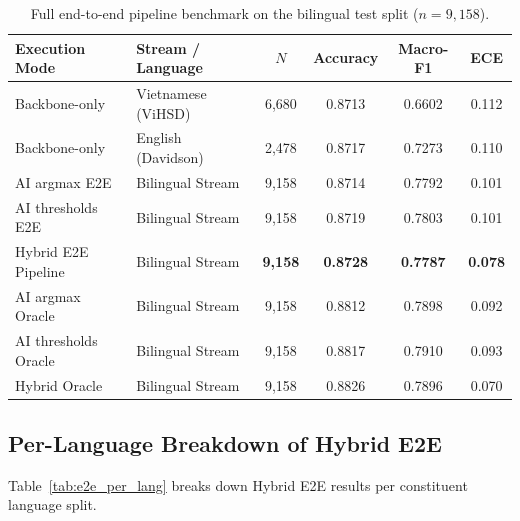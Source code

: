 \documentclass[runningheads]{llncs}
\begin{document}
\begin{table}[H]
\centering
\caption{Full end-to-end pipeline benchmark on the bilingual test split ($n=9{,}158$).}
\label{tab:e2e_detailed_full}
\begin{tabular}{llcccc}
\toprule
Execution Mode & Stream / Language & $N$ & Accuracy & Macro-F1 & ECE \\
\midrule
Backbone-only & Vietnamese (ViHSD) & 6,680 & 0.8713 & 0.6602 & 0.112 \\
Backbone-only & English (Davidson) & 2,478 & 0.8717 & 0.7273 & 0.110 \\
\midrule
AI argmax E2E & Bilingual Stream & 9,158 & 0.8714 & 0.7792 & 0.101 \\
AI thresholds E2E & Bilingual Stream & 9,158 & 0.8719 & 0.7803 & 0.101 \\
Hybrid E2E Pipeline & Bilingual Stream & \textbf{9,158} & \textbf{0.8728} & \textbf{0.7787} & \textbf{0.078} \\
\midrule
AI argmax Oracle & Bilingual Stream & 9,158 & 0.8812 & 0.7898 & 0.092 \\
AI thresholds Oracle & Bilingual Stream & 9,158 & 0.8817 & 0.7910 & 0.093 \\
Hybrid Oracle & Bilingual Stream & 9,158 & 0.8826 & 0.7896 & 0.070 \\
\bottomrule
\end{tabular}
\end{table}

\subsection{Per-Language Breakdown of Hybrid E2E}
Table~\ref{tab:e2e_per_lang} breaks down Hybrid E2E results per constituent language split.

\begin{table}[H]
\centering
\caption{Language-stratified metrics for Hybrid E2E pipeline vs Oracle routing baselines.}
\label{tab:e2e_per_lang}
\scriptsize
\setlength{\tabcolsep}{2pt}
\end{table}
\end{document}
